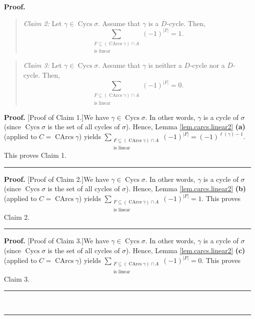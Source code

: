 \documentclass[numbers=enddot,12pt,final,onecolumn,notitlepage]{scrartcl}%
\numberwithin{exer}{section}
\theoremstyle{definition}
\newenvironment{statement}{\begin{quote}}{\end{quote}}
\newenvironment{proof}[1][Proof]{\noindent\textbf{#1.} }{\ \rule{0.5em}{0.5em}}
\let\sumnonlimits\sum
\renewcommand{\sum}{\sumnonlimits\limits}
\newenvironment{verlong}{}{}
\begin{document}
\begin{verlong}
\begin{proof}
\begin{statement}
\end{statement}

\begin{statement}
\textit{Claim 2:} Let $\gamma\in\operatorname*{Cycs}\sigma$. Assume that
$\gamma$ is a $\overline{D}$-cycle. Then,%
\[
\sum_{\substack{F\subseteq\left(  \operatorname*{CArcs}\gamma\right)  \cap
A\\\text{is linear}}}\left(  -1\right)  ^{\left\vert F\right\vert }=1.
\]

\end{statement}

\begin{statement}
\textit{Claim 3:} Let $\gamma\in\operatorname*{Cycs}\sigma$. Assume that
$\gamma$ is neither a $D$-cycle nor a $\overline{D}$-cycle. Then,%
\[
\sum_{\substack{F\subseteq\left(  \operatorname*{CArcs}\gamma\right)  \cap
A\\\text{is linear}}}\left(  -1\right)  ^{\left\vert F\right\vert }=0.
\]

\end{statement}

\begin{proof}
[Proof of Claim 1.]We have $\gamma\in\operatorname*{Cycs}\sigma$. In other
words, $\gamma$ is a cycle of $\sigma$ (since $\operatorname*{Cycs}\sigma$ is
the set of all cycles of $\sigma$). Hence, Lemma \ref{lem.carcs.linear2}
\textbf{(a)} (applied to $C=\operatorname*{CArcs}\gamma$) yields
$\sum_{\substack{F\subseteq\left(  \operatorname*{CArcs}\gamma\right)  \cap
A\\\text{is linear}}}\left(  -1\right)  ^{\left\vert F\right\vert }=\left(
-1\right)  ^{\ell\left(  \gamma\right)  -1}$. This proves Claim 1.
\end{proof}

\begin{proof}
[Proof of Claim 2.]We have $\gamma\in\operatorname*{Cycs}\sigma$. In other
words, $\gamma$ is a cycle of $\sigma$ (since $\operatorname*{Cycs}\sigma$ is
the set of all cycles of $\sigma$). Hence, Lemma \ref{lem.carcs.linear2}
\textbf{(b)} (applied to $C=\operatorname*{CArcs}\gamma$) yields
$\sum_{\substack{F\subseteq\left(  \operatorname*{CArcs}\gamma\right)  \cap
A\\\text{is linear}}}\left(  -1\right)  ^{\left\vert F\right\vert }=1$. This
proves Claim 2.
\end{proof}

\begin{proof}
[Proof of Claim 3.]We have $\gamma\in\operatorname*{Cycs}\sigma$. In other
words, $\gamma$ is a cycle of $\sigma$ (since $\operatorname*{Cycs}\sigma$ is
the set of all cycles of $\sigma$). Hence, Lemma \ref{lem.carcs.linear2}
\textbf{(c)} (applied to $C=\operatorname*{CArcs}\gamma$) yields
$\sum_{\substack{F\subseteq\left(  \operatorname*{CArcs}\gamma\right)  \cap
A\\\text{is linear}}}\left(  -1\right)  ^{\left\vert F\right\vert }=0$. This
proves Claim 3.
\end{proof}


\end{proof}
\end{verlong}
\end{document}
